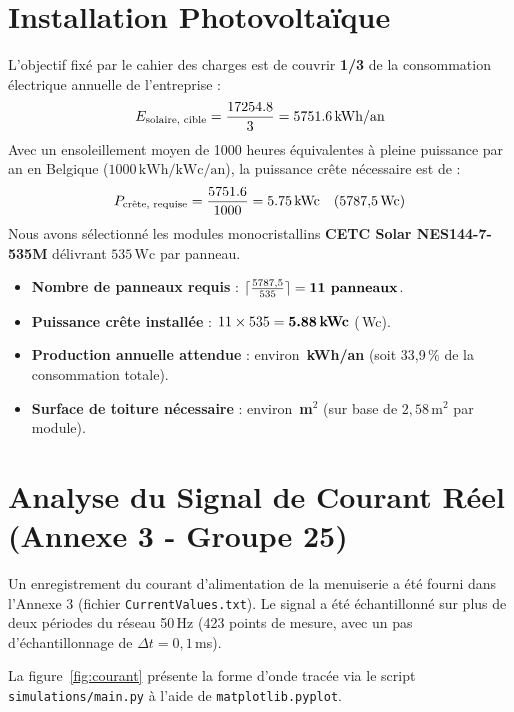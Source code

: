 \documentclass[11pt,a4paper]{article}
\begin{document}
\section{Installation Photovoltaïque}
L'objectif fixé par le cahier des charges est de couvrir \textbf{1/3} de la consommation électrique annuelle de l'entreprise :
\begin{equation}
    E_{\text{solaire, cible}} = \frac{17254.8}{3} = 5751.6\,\text{kWh/an}
\end{equation}
Avec un ensoleillement moyen de 1000 heures équivalentes à pleine puissance par an en Belgique ($1000\,\text{kWh/kWc/an}$), la puissance crête nécessaire est de :
\begin{equation}
    P_{\text{crête, requise}} = \frac{5751.6}{1000} = 5.75\,\text{kWc} \quad (5787{,}5\,\text{Wc})
\end{equation}
Nous avons sélectionné les modules monocristallins \textbf{CETC Solar NES144-7-535M} délivrant $535\,\text{Wc}$ par panneau.
\begin{itemize}
    \item \textbf{Nombre de panneaux requis} : $\lceil \frac{5787{,}5}{535} \rceil = \textbf{11\text{ panneaux}}$.
    \item \textbf{Puissance crête installée} : $11 \times 535 = \textbf{5.88\,kWc}$ (\ValSolarActualProdKWh\,Wc).
    \item \textbf{Production annuelle attendue} : environ \textbf{\ValSolarActualProdKWh\,kWh/an} (soit 33,9\,\% de la consommation totale).
    \item \textbf{Surface de toiture nécessaire} : environ \textbf{\ValSolarSurfaceMdeux\,m$^2$} (sur base de $2{,}58\,\text{m}^2$ par module).
\end{itemize}

\section{Analyse du Signal de Courant Réel (Annexe 3 - Groupe 25)}
Un enregistrement du courant d'alimentation de la menuiserie a été fourni dans l'Annexe 3 (fichier \texttt{CurrentValues.txt}). Le signal a été échantillonné sur plus de deux périodes du réseau 50\,Hz (423 points de mesure, avec un pas d'échantillonnage de $\Delta t = 0{,}1$\,ms).

La figure~\ref{fig:courant} présente la forme d'onde tracée via le script \texttt{simulations/main.py} à l'aide de \texttt{matplotlib.pyplot}.
\end{document}
